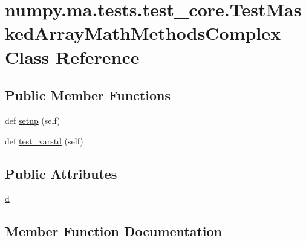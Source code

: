 \hypertarget{classnumpy_1_1ma_1_1tests_1_1test__core_1_1TestMaskedArrayMathMethodsComplex}{}\section{numpy.\+ma.\+tests.\+test\+\_\+core.\+Test\+Masked\+Array\+Math\+Methods\+Complex Class Reference}
\label{classnumpy_1_1ma_1_1tests_1_1test__core_1_1TestMaskedArrayMathMethodsComplex}
\subsection*{Public Member Functions}
\begin{DoxyCompactItemize}
\item 
def \hyperlink{classnumpy_1_1ma_1_1tests_1_1test__core_1_1TestMaskedArrayMathMethodsComplex_ade94361ae9111c7063929334067743ac}{setup} (self)
\item 
def \hyperlink{classnumpy_1_1ma_1_1tests_1_1test__core_1_1TestMaskedArrayMathMethodsComplex_a0307c38481255fb28ae23b58012234ce}{test\+\_\+varstd} (self)
\end{DoxyCompactItemize}
\subsection*{Public Attributes}
\begin{DoxyCompactItemize}
\item 
\hyperlink{classnumpy_1_1ma_1_1tests_1_1test__core_1_1TestMaskedArrayMathMethodsComplex_ad97297d98671bfdf7a9300f9249b1b15}{d}
\end{DoxyCompactItemize}


\subsection{Member Function Documentation}
\mbox{\label{classnumpy_1_1ma_1_1tests_1_1test__core_1_1TestMaskedArrayMathMethodsComplex_ade94361ae9111c7063929334067743ac}} 
